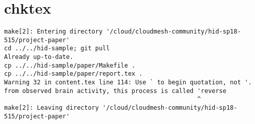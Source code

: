 \appendix
\section{chktex}
\begin{tiny}
\begin{verbatim}
make[2]: Entering directory '/cloud/cloudmesh-community/hid-sp18-515/project-paper'
cd ../../hid-sample; git pull
Already up-to-date.
cp ../../hid-sample/paper/Makefile .
cp ../../hid-sample/paper/report.tex .
Warning 32 in content.tex line 114: Use ` to begin quotation, not '.
from observed brain activity, this process is called 'reverse   
                                                     ^
make[2]: Leaving directory '/cloud/cloudmesh-community/hid-sp18-515/project-paper'
\end{verbatim}
\end{tiny}
